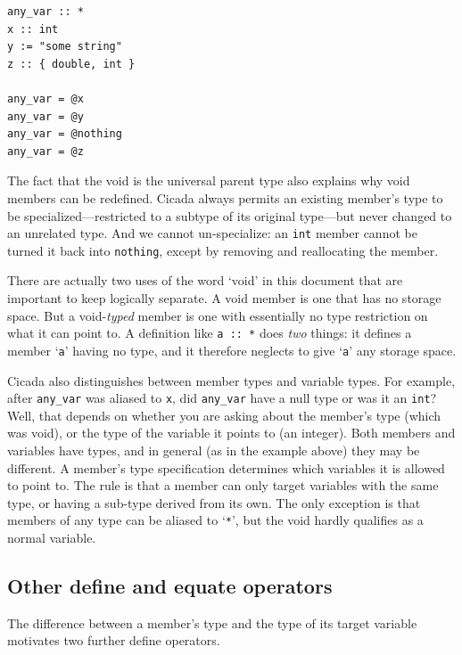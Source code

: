 \documentclass{article}
\newenvironment{code}{
       \begin{list}{}{
               \setlength{\leftmargin}{.4in}
               \setlength{\rightmargin}{0in}
               \setlength{\topsep}{.2in}
       }
       \small
       \item[] }
       { \end{list}   }
\begin{document}
\begin{code} \begin{verbatim}
any_var :: *
x :: int
y := "some string"
z :: { double, int }

any_var = @x
any_var = @y
any_var = @nothing
any_var = @z
\end{verbatim} \end{code}

The fact that the void is the universal parent type also explains why void members can be redefined.  Cicada always permits an existing member's type to be specialized---restricted to a subtype of its original type---but never changed to an unrelated type.  And we cannot un-specialize:  an \verb#int# member cannot be turned it back into \verb#nothing#, except by removing and reallocating the member.

There are actually two uses of the word `void' in this document that are important to keep logically separate.  A void member is one that has no storage space.  But a void-\emph{typed} member is one with essentially no type restriction on what it can point to.  A definition like \verb#a :: *# does \emph{two} things:  it defines a member `\verb#a#' having no type, and it therefore neglects to give `\verb#a#' any storage space.

Cicada also distinguishes between member types and variable types.  For example, after \texttt{any\_var} was aliased to \texttt{x}, did \texttt{any\_var} have a null type or was it an \verb#int#?  Well, that depends on whether you are asking about the member's type (which was void), or the type of the variable it points to (an integer).  Both members and variables have types, and in general (as in the example above) they may be different.  A member's type specification determines which variables it is allowed to point to.  The rule is that a member can only target variables with the same type, or having a sub-type derived from its own.  The only exception is that members of any type can be aliased to `\texttt{*}', but the void hardly qualifies as a normal variable.\\




\subsection{Other define and equate operators}

The difference between a member's type and the type of its target variable motivates two further define operators.
\end{document}
